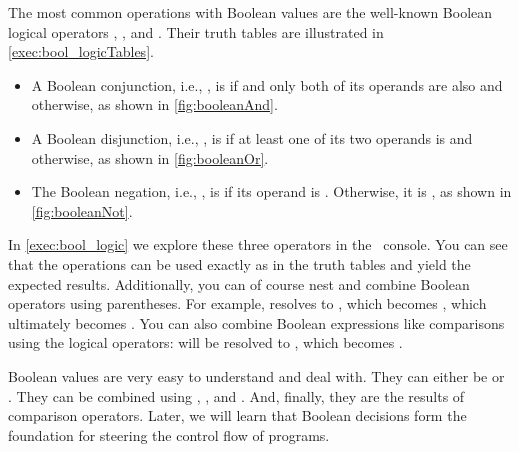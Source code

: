 %
%
The most common operations with Boolean values are the well-known Boolean logical operators , , and .
Their truth tables are illustrated in \cref{exec:bool_logicTables}.%
%
\begin{itemize}%
%
\item A Boolean conjunction, i.e., , is  if and only both of its operands are also  and  otherwise, as shown in \cref{fig:booleanAnd}.%
%
\item A Boolean disjunction, i.e., , is  if at least one of its two operands is  and  otherwise, as shown in \cref{fig:booleanOr}.%
%
\item The Boolean negation, i.e., , is  if its operand is . %
Otherwise, it is , as shown in \cref{fig:booleanNot}.%
%
\end{itemize}%
%
\begin{sloppypar}%
In \cref{exec:bool_logic} we explore these three operators in the \python\ console.
You can see that the operations can be used exactly as in the truth tables and yield the expected results.
Additionally, you can of course nest and combine Boolean operators using parentheses\pythonIdx{(}\pythonIdx{)}.
For example,  resolves to , which becomes , which ultimately becomes .
You can also combine Boolean expressions like comparisons using the logical operators:
 will be resolved to , which becomes .%
\end{sloppypar}%
%
\endhsection%
%
%
%
Boolean values are very easy to understand and deal with.
They can either be  or .
They can be combined using , , and .
And, finally, they are the results of comparison operators.
Later, we will learn that Boolean decisions form the foundation for steering the control flow of programs.%
%
\endhsection%
\FloatBarrier%
\endhsection%
%
